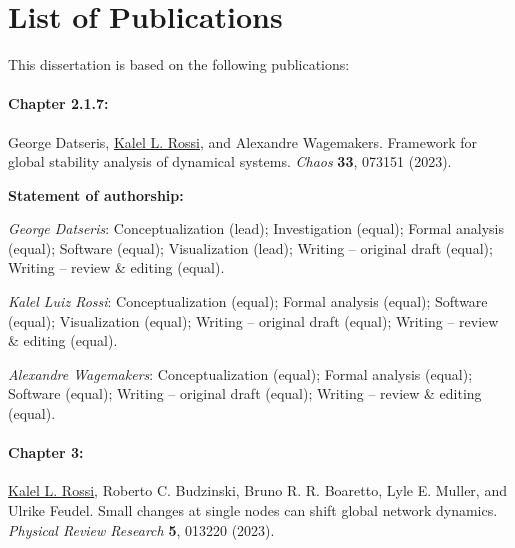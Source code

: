 
\section*{List of Publications}
This dissertation is based on the following publications:


\paragraph{Chapter 2.1.7:}
George Datseris, \underline{Kalel L. Rossi}, and Alexandre Wagemakers. Framework for global stability analysis of dynamical systems. \textit{Chaos} \textbf{33}, 073151 (2023).

{\vspace{0.3cm}\footnotesize \textbf{Statement of authorship:} %

\textit{George Datseris}: Conceptualization (lead); Investigation (equal); Formal analysis (equal); Software (equal); Visualization (lead); Writing – original draft (equal); Writing – review \& editing (equal). 

\textit{Kalel Luiz Rossi}: Conceptualization (equal); Formal analysis (equal); Software (equal); Visualization (equal); Writing – original draft (equal); Writing – review \& editing (equal). 

\textit{Alexandre Wagemakers}: Conceptualization (equal); Formal analysis (equal); Software (equal); Writing – original draft (equal); Writing – review \& editing (equal).
}

\paragraph{Chapter 3:}
\underline{Kalel L. Rossi}, Roberto C. Budzinski, Bruno R. R. Boaretto, Lyle E. Muller, and Ulrike Feudel.  Small changes at single nodes can shift global network dynamics. \textit{Physical Review Research} \textbf{5}, 013220 (2023). 

